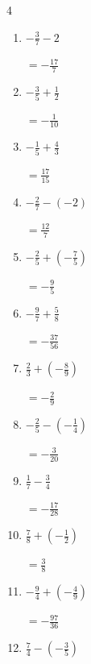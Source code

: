 \begin{multicols}{4}
\begin{enumerate}
        $\displaystyle =\frac{3}{20}$

  \item $\displaystyle -\frac{3}{7} - 2$

        $\displaystyle =-\frac{17}{7}$

  \item $\displaystyle -\frac{3}{5} + \frac{1}{2}$

        $\displaystyle =-\frac{1}{10}$

  \item $\displaystyle -\frac{1}{5} + \frac{4}{3}$

        $\displaystyle =\frac{17}{15}$

  \item $\displaystyle -\frac{2}{7} - \left(-2\right)$

        $\displaystyle =\frac{12}{7}$

\columnbreak %

\resetques

  \item $\displaystyle -\frac{2}{5} + \left(-\frac{7}{5}\right)$

        $\displaystyle =-\frac{9}{5}$

  \item $\displaystyle -\frac{9}{7} + \frac{5}{8}$

        $\displaystyle =-\frac{37}{56}$

  \item $\displaystyle \frac{2}{3} + \left(-\frac{8}{9}\right)$

        $\displaystyle =-\frac{2}{9}$

  \item $\displaystyle -\frac{2}{5} - \left(-\frac{1}{4}\right)$

        $\displaystyle =-\frac{3}{20}$

  \item $\displaystyle \frac{1}{7} - \frac{3}{4}$

        $\displaystyle =-\frac{17}{28}$

  \item $\displaystyle \frac{7}{8} + \left(-\frac{1}{2}\right)$

        $\displaystyle =\frac{3}{8}$

  \item $\displaystyle -\frac{9}{4} + \left(-\frac{4}{9}\right)$

        $\displaystyle =-\frac{97}{36}$

  \item $\displaystyle \frac{7}{4} - \left(-\frac{3}{5}\right)$


\end{enumerate}
\end{multicols}
